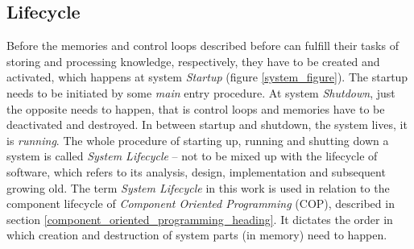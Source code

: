 %
%
%
%
%
%
%

\subsection{Lifecycle}
\label{lifecycle_heading}

Before the memories and control loops described before can fulfill their tasks
of storing and processing knowledge, respectively, they have to be created and
activated, which happens at system \emph{Startup} (figure \ref{system_figure}).
The startup needs to be initiated by some \emph{main} entry procedure. At
system \emph{Shutdown}, just the opposite needs to happen, that is control
loops and memories have to be deactivated and destroyed. In between startup and
shutdown, the system lives, it is \emph{running}. The whole procedure of
starting up, running and shutting down a system is called
\emph{System Lifecycle} -- not to be mixed up with the lifecycle of software,
which refers to its analysis, design, implementation and subsequent growing
old. The term \emph{System Lifecycle} in this work is used in relation to the
component lifecycle of \emph{Component Oriented Programming} (COP), described
in section \ref{component_oriented_programming_heading}. It dictates the order
in which creation and destruction of system parts (in memory) need to happen.

